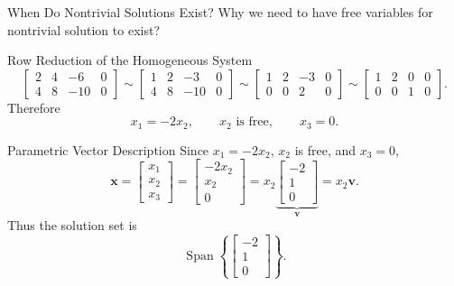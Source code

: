 \begin{frame}{When Do Nontrivial Solutions Exist?}
  Why we need to have free variables for nontrivial solution to exist?
\end{frame}

\begin{frame}{Row Reduction of the Homogeneous System}
  \[
    \left[\begin{array}{ccc|c}2&4&-6&0\\4&8&-10&0\end{array}\right]
    \sim
    \left[\begin{array}{ccc|c}1&2&-3&0\\4&8&-10&0\end{array}\right]
    \sim
    \left[\begin{array}{ccc|c}1&2&-3&0\\0&0&2&0\end{array}\right]
    \sim
    \left[\begin{array}{ccc|c}1&2&0&0\\0&0&1&0\end{array}\right].
  \]
  Therefore
  \[
    x_1=-2x_2,\qquad x_2\text{ is free},\qquad x_3=0.
  \]
\end{frame}

\begin{frame}{Parametric Vector Description}
  Since $x_1=-2x_2$, $x_2$ is free, and $x_3=0$,
  \[
    \mathbf{x}
    =\begin{bmatrix}x_1\\x_2\\x_3\end{bmatrix}
    =\begin{bmatrix}-2x_2\\x_2\\0\end{bmatrix}
    =x_2\underbrace{\begin{bmatrix}-2\\1\\0\end{bmatrix}}_{\mathbf{v}}
    = x_2 \mathbf{v}.
  \]
  Thus the solution set is
  \[
    \operatorname{Span}\left\{\begin{bmatrix}-2\\1\\0\end{bmatrix}\right\}.
  \]
\end{frame}

